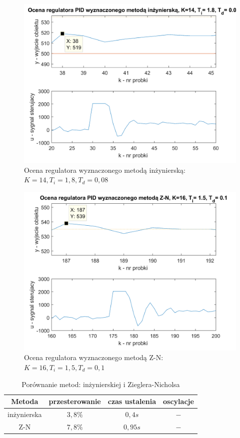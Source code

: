 \documentclass[a4paper, 10pt]{article}
\begin{document}
\begin{figure}[H]
	\centering
	\includegraphics[width=0.9\linewidth]{ocenaPIDMI_przereg}
	\caption{Ocena regulatora wyznaczonego metodą inżynierską: $K=14, T_{i}=1,8, T_{d}=0,08$}
	\label{fig:ocenaPIDMI_przereg}
\end{figure}
\begin{figure}[H]
	\centering
	\includegraphics[width=0.9\linewidth]{ocenaPIDZN_przebieg}
	\caption{Ocena regulatora wyznaczonego metodą Z-N: $K=16, T_{i}=1,5, T_{d}=0,1$}
	\label{fig:ocenaZN_przebieg}
\end{figure}


\begin{table}[h]
		\caption{Porównanie metod: inżynierskiej i Zieglera-Nicholsa} 
\begin{center}
	\begin{tabular}{|c|c|c|c|}  \hline
		Metoda & przesterowanie  & czas ustalenia & oscylacje \\ \hline
		inżynierska & $3,8\%$  & $0,4s$ & $-$ \\ \hline      
		Z-N & $7,8\%$  & $0,95s$ & $-$ \\ \hline 	
	\end{tabular}
\end{center} 
\end{table}
\end{document}
